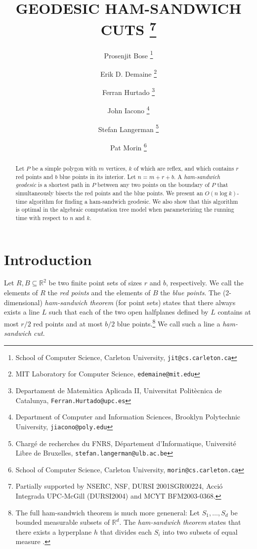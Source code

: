 \documentclass[charterfonts,lotsofwhite]{patmorin}
\newcommand{\email}[1]{\texttt{#1}}
\begin{document}
\title{\MakeUppercase{Geodesic Ham-Sandwich Cuts}%
  \thanks{Partially supported by  NSERC, NSF, DURSI 2001SGR00224, Acció Integrada
UPC-McGill (DURSI2004) and MCYT BFM2003-0368.}}
\author{Prosenjit Bose%
	\thanks{School of Computer Science, Carleton University,
		\email{jit@cs.carleton.ca}}
   \and Erik D. Demaine%
	\thanks{MIT Laboratory for Computer Science, 
		\email{edemaine@mit.edu}}
   \and Ferran Hurtado%
	\thanks{Departament de Matem\`atica Aplicada II, 
		Universitat Polit\`ecnica de Catalunya, 
		\email{Ferran.Hurtado@upc.es}}
   \and John Iacono%
        \thanks{Department of Computer and Information Sciences,
		Brooklyn Polytechnic University,
		\email{jiacono@poly.edu}}
   \and Stefan Langerman%
	\thanks{Charg\'e de recherches du FNRS, 
		D\'epartement d'Informatique,
		Universit\'e Libre de Bruxelles,
		\email{stefan.langerman@ulb.ac.be}}
   \and Pat Morin%
        \thanks{School of Computer Science, Carleton University,
		\email{morin@cs.carleton.ca}}
}
\date{}
\maketitle

\begin{abstract} Let $P$ be a simple polygon with $m$ vertices, $k$ of
which are reflex, and which contains $r$ red points and $b$ blue
points in its interior.  Let $n=m+r+b$. A \emph{ham-sandwich geodesic}
is a shortest path in $P$ between any two points on the boundary of
$P$ that simultaneously bisects the red points and the blue points.
We present an $O(n \log k)$-time algorithm for finding a ham-sandwich
geodesic.  We also show that this algorithm is optimal in the
algebraic computation tree model when parameterizing the running time
with respect to $n$ and $k$. 
\end{abstract}


\section{Introduction}

Let $R,B\subseteq \mathbb{R}^2$ be two finite point sets of sizes $r$
and $b$, respectively.  We call the elements of $R$ the \emph{red
points} and the elements of $B$ the \emph{blue points}.  The
(2-dimensional) \emph{ham-sandwich theorem} (for point sets) states
that there always exists a line $L$ such that each of the two open
halfplanes defined by $L$ contains at most $r/2$ red points and at
most $b/2$ blue points.\footnote{The full ham-sandwich theorem is much
more geneneral:  Let $S_1,\ldots,S_d$ be bounded measurable subsets of
$\mathbb{R}^d$.  The \emph{ham-sandwich theorem} states that there
exists a hyperplane $h$ that divides each $S_i$ into two subsets of
equal measure \cite{st42}.}  We call such a line a \emph{ham-sandwich
cut}.
\end{document}
